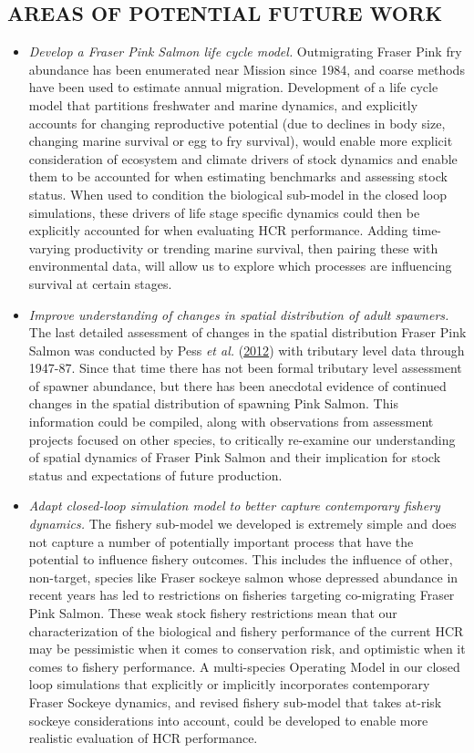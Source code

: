 \documentclass[french,11pt]{book}
\begin{document}
\hypertarget{areas-of-potential-future-work}{%
\subsection{AREAS OF POTENTIAL FUTURE WORK}\label{areas-of-potential-future-work}}
\begin{itemize}
\item
  \emph{Develop a Fraser Pink Salmon life cycle model.} Outmigrating Fraser Pink fry abundance has been enumerated near Mission since 1984, and coarse methods have been used to estimate annual migration. Development of a life cycle model that partitions freshwater and marine dynamics, and explicitly accounts for changing reproductive potential (due to declines in body size, changing marine survival or egg to fry survival), would enable more explicit consideration of ecosystem and climate drivers of stock dynamics and enable them to be accounted for when estimating benchmarks and assessing stock status. When used to condition the biological sub-model in the closed loop simulations, these drivers of life stage specific dynamics could then be explicitly accounted for when evaluating HCR performance. Adding time-varying productivity or trending marine survival, then pairing these with environmental data, will allow us to explore which processes are influencing survival at certain stages.
\item
  \emph{Improve understanding of changes in spatial distribution of adult spawners.} The last detailed assessment of changes in the spatial distribution Fraser Pink Salmon was conducted by Pess \emph{et al.} (\protect\hyperlink{ref-pessInfluencePopulationDynamics2012}{2012}) with tributary level data through 1947-87. Since that time there has not been formal tributary level assessment of spawner abundance, but there has been anecdotal evidence of continued changes in the spatial distribution of spawning Pink Salmon. This information could be compiled, along with observations from assessment projects focused on other species, to critically re-examine our understanding of spatial dynamics of Fraser Pink Salmon and their implication for stock status and expectations of future production.
\item
  \emph{Adapt closed-loop simulation model to better capture contemporary fishery dynamics.} The fishery sub-model we developed is extremely simple and does not capture a number of potentially important process that have the potential to influence fishery outcomes. This includes the influence of other, non-target, species like Fraser sockeye salmon whose depressed abundance in recent years has led to restrictions on fisheries targeting co-migrating Fraser Pink Salmon. These weak stock fishery restrictions mean that our characterization of the biological and fishery performance of the current HCR may be pessimistic when it comes to conservation risk, and optimistic when it comes to fishery performance. A multi-species Operating Model in our closed loop simulations that explicitly or implicitly incorporates contemporary Fraser Sockeye dynamics, and revised fishery sub-model that takes at-risk sockeye considerations into account, could be developed to enable more realistic evaluation of HCR performance.
\end{itemize}
\end{document}
